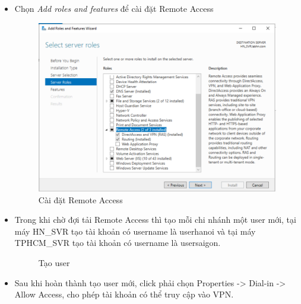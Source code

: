     \begin{itemize}
        \item Chọn \textit{Add roles and features} để cài đặt Remote Access 

        \begin{figure}[htbp]
        \centering
        \includegraphics[width=0.7\linewidth]{SiteToSiteImg/installRemoteAccess.png}
        \caption{Cài đặt Remote Access}
        \end{figure}
        \item Trong khi chờ đợi tải Remote Access thì tạo mỗi chi nhánh một user mới, tại máy HN\_SVR tạo tài khoản có username là userhanoi và  tại máy TPHCM\_SVR tạo tài khoản có username là usersaigon. 
\newpage
        \begin{figure}[htbp]
            \hfill
            \hfill
            \caption{Tạo user}
        \end{figure}
        \item Sau khi hoàn thành tạo user mới, click phải chọn Properties -> Dial-in -> Allow Access, cho phép tài khoản có thể truy cập vào VPN.
        

\end{itemize}
